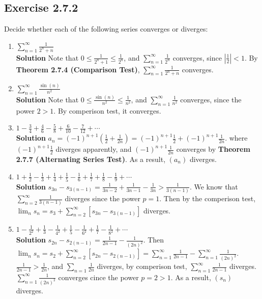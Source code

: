 \documentclass[12pt]{report}
\begin{document}
\subsection*{Exercise 2.7.2}
Decide whether each of the following series converges or
diverges:\
\begin{enumerate}[label=(\alph*)]
    \item $\sum_{n=1}^{\infty} \frac{1}{2^n+n}$\\
    \textbf{Solution} Note that $0 \leq \frac{1}{2^n+1} \leq \frac{1}{2^n}$, and $\sum_{n=1}^{\infty}\frac{1}{2^n}$
    converges, since $|\frac{1}{2}|<1$. By \textbf{Theorem 2.7.4 (Comparison Test)}, $\sum_{n=1}^{\infty} \frac{1}{2^n+n}$ converges.
    \item $\sum_{n=1}^{\infty} \frac{\sin(n)}{n^2}$\\
    \textbf{Solution} Note that $0 \leq \frac{\sin(n)}{n^2} \leq \frac{1}{n^2}$, and $\sum_{n=1}^{\infty}\frac{1}{n^2}$
    converges, since the power $2>1$. By comperison test, it converges.
    \item $1-\frac{3}{4}+\frac{4}{6}-\frac{5}{8}+\frac{6}{10}-\frac{7}{12}+\cdots$\\
    \textbf{Solution} $a_n = (-1)^{n+1}(\frac{1}{2} + \frac{1}{2n}) = (-1)^{n+1}\frac{1}{2} + (-1)^{n+1}\frac{1}{2n}$. 
    where $(-1)^{n+1}\frac{1}{2}$ diverges apparently, and $(-1)^{n+1}\frac{1}{2n}$ converges by \textbf{Theorem 2.7.7 (Alternating Series Test)}. As a result, $(a_n)$ diverges.
    \item $1+\frac{1}{2}-\frac{1}{3}+\frac{1}{4}+\frac{1}{5}-\frac{1}{6}+\frac{1}{7}+\frac{1}{8}-\frac{1}{9}+\cdots$\\
    \textbf{Solution} $s_{3n}-s_{3(n-1)}=\frac{1}{3n-2}+\frac{1}{3n-1}-\frac{1}{3n} > \frac{1}{3(n-1)}$. We know that 
    $\sum_{n=2}^{\infty} \frac{1}{3(n-1)}$ diverges since the power $p=1$. Then by the comperison test, $\lim_{n} s_n = s_3+\sum_{n=2}^{\infty} [s_{3n}-s_{3(n-1)}]$ diverges.
    \item $1-\frac{1}{2^2}+\frac{1}{3}-\frac{1}{4^2}+\frac{1}{5}-\frac{1}{6^2}+\frac{1}{7}-\frac{1}{8^2}+\cdots$\\
    \textbf{Solution} $s_{2n}-s_{2(n-1)} = \frac{1}{2n-1}-\frac{1}{(2n)^2}$. Then $\lim_n s_n = s_2 + \sum_{n=2}^{\infty} [s_{2n}-s_{2(n-1)}] = \sum_{n=1}^{\infty} \frac{1}{2n-1} - \sum_{n=1}^{\infty}\frac{1}{(2n)^2}$.
    $\frac{1}{2n-1} > \frac{1}{2n}$, and $\sum_{n=1} \frac{1}{2n}$ diverges, by comperison test, $\sum_{n=1}^{\infty} \frac{1}{2n-1}$ diverges.\\
    $\sum_{n=1}^{\infty} \frac{1}{(2n)^2}$ converges cince the power $p=2>1$. As a result, $(s_n)$ diverges.
\end{enumerate}
\end{document}
